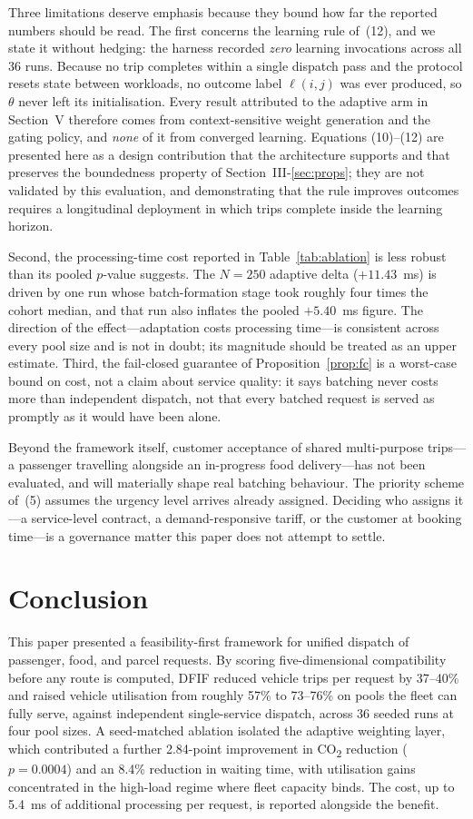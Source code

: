 \documentclass[conference]{IEEEtran}
\begin{document}
Three limitations deserve emphasis because they bound how far the reported
numbers should be read. The first concerns the learning rule of~(12), and we
state it without hedging: the harness recorded \emph{zero} learning
invocations across all 36 runs. Because no trip completes within a single
dispatch pass and the protocol resets state between workloads, no outcome
label $\ell(i,j)$ was ever produced, so $\theta$ never left its
initialisation. Every result attributed to the adaptive arm in
Section~V therefore comes from context-sensitive weight generation and the
gating policy, and \emph{none} of it from converged learning. Equations
(10)--(12) are presented here as a design contribution that the architecture
supports and that preserves the boundedness property of
Section~III-\ref{sec:props}; they are not validated by this evaluation, and
demonstrating that the rule improves outcomes requires a longitudinal
deployment in which trips complete inside the learning horizon.

Second, the processing-time cost reported in Table~\ref{tab:ablation} is
less robust than its pooled $p$-value suggests. The $N=250$ adaptive delta
($+11.43$~ms) is driven by one run whose batch-formation stage took roughly
four times the cohort median, and that run also inflates the pooled
$+5.40$~ms figure. The direction of the effect---adaptation costs
processing time---is consistent across every pool size and is not in doubt;
its magnitude should be treated as an upper estimate. Third, the
fail-closed guarantee of Proposition~\ref{prop:fc} is a worst-case bound on
cost, not a claim about service quality: it says batching never costs more
than independent dispatch, not that every batched request is served as
promptly as it would have been alone.

Beyond the framework itself, customer acceptance of shared multi-purpose
trips---a passenger travelling alongside an in-progress food delivery---has
not been evaluated, and will materially shape real batching behaviour. The
priority scheme of~(5) assumes the urgency level arrives already assigned.
Deciding who assigns it---a service-level contract, a demand-responsive
tariff, or the customer at booking time---is a governance matter this paper
does not attempt to settle.

\section{Conclusion}
This paper presented a feasibility-first framework for unified dispatch of
passenger, food, and parcel requests. By scoring five-dimensional
compatibility before any route is computed, DFIF reduced vehicle trips per
request by 37--40\% and raised vehicle utilisation from roughly 57\% to
73--76\% on pools the fleet can fully serve, against independent
single-service dispatch, across 36 seeded runs at four pool sizes. A seed-matched ablation isolated the adaptive weighting
layer, which contributed a further 2.84-point improvement in
CO\textsubscript{2} reduction ($p=0.0004$) and an 8.4\% reduction in waiting
time, with utilisation gains concentrated in the high-load regime where fleet
capacity binds. The cost, up to 5.4~ms of additional processing per request,
is reported alongside the benefit.
\end{document}
